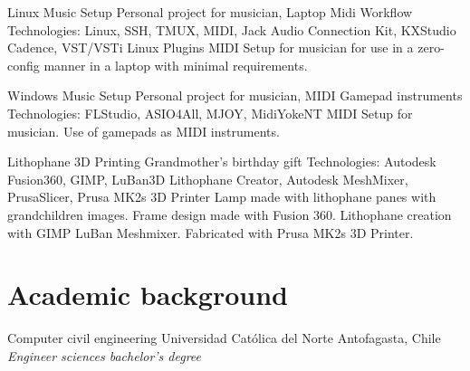 \documentclass[draft,color,12pt,letterpaper,sans]{moderncv}
\begin{document}
\cventry {}
{Linux Music Setup}
{Personal project for musician, Laptop Midi Workflow}
{}
{\newline Technologies: Linux, SSH, TMUX, MIDI, Jack Audio Connection Kit, KXStudio Cadence, VST/VSTi Linux Plugins}
{MIDI Setup for musician for use in a zero-config manner in a laptop with minimal requirements.\newline}

\cventry {}
{Windows Music Setup}
{Personal project for musician, MIDI Gamepad instruments}
{}
{\newline Technologies: FLStudio, ASIO4All, MJOY, MidiYokeNT}
{MIDI Setup for musician. Use of gamepads as MIDI instruments.\newline}


\cventry {}
{Lithophane 3D Printing}
{Grandmother's birthday gift}
{}
{\newline Technologies: Autodesk Fusion360, GIMP, LuBan3D Lithophane Creator, Autodesk MeshMixer, PrusaSlicer, Prusa MK2s 3D Printer}
{Lamp made with lithophane panes with grandchildren images. Frame design made with Fusion 360. Lithophane creation with GIMP \faArrowRight LuBan \faArrowRight Meshmixer. Fabricated with Prusa MK2s 3D Printer. \newline}



\section{Academic background}
{Computer civil engineering}
{Universidad Cat\'olica del Norte}
{Antofagasta, Chile}
{\textit{Engineer sciences bachelor's degree}}
{}
\end{document}
